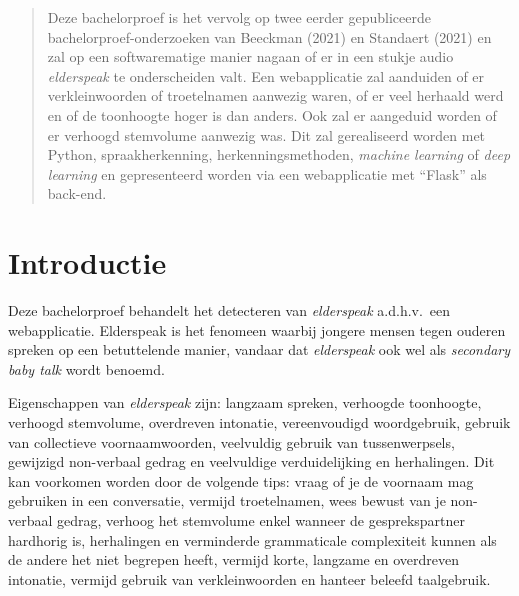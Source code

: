 \documentclass[a0,portrait]{a0poster}
\begin{document}
\begin{multicols}{2} %


\color{HoGentAccent1} %

\begin{abstract}
Deze bachelorproef is het vervolg op twee eerder gepubliceerde bachelorproef-onderzoeken van Beeckman (2021) en Standaert (2021) en zal op een softwarematige manier nagaan of er in een stukje audio \textit{elderspeak} te onderscheiden valt. Een webapplicatie zal aanduiden of er verkleinwoorden of troetelnamen aanwezig waren, of er veel herhaald werd en of de toonhoogte hoger is dan anders. Ook zal er aangeduid worden of er verhoogd stemvolume aanwezig was. Dit zal gerealiseerd worden met Python, spraakherkenning, herkenningsmethoden, \textit{machine learning} of \textit{deep learning} en gepresenteerd worden via een webapplicatie met ``Flask'' als back-end.
\end{abstract}
\vspace{1cm}

\color{HoGentAccent1}
\section*{Introductie}
\color{black}
\color{black}
Deze bachelorproef behandelt het detecteren van \textit{elderspeak} a.d.h.v.\ een webapplicatie. Elderspeak is het fenomeen waarbij jongere mensen tegen ouderen spreken op een betuttelende manier, vandaar dat \textit{elderspeak} ook wel als \textit{secondary baby talk} wordt benoemd.

\newline
Eigenschappen van \textit{elderspeak} zijn: langzaam spreken, verhoogde toonhoogte, verhoogd stemvolume, overdreven intonatie, vereenvoudigd woordgebruik, gebruik van collectieve voornaamwoorden, veelvuldig gebruik van tussenwerpsels, gewijzigd non-verbaal gedrag en veelvuldige verduidelijking en herhalingen. Dit kan voorkomen worden door de volgende tips: vraag of je de voornaam mag gebruiken in een conversatie, vermijd troetelnamen, wees bewust van je non-verbaal gedrag, verhoog het stemvolume enkel wanneer de gesprekspartner hardhorig is, herhalingen en verminderde grammaticale complexiteit kunnen als de andere het niet begrepen heeft, vermijd korte, langzame en overdreven intonatie, vermijd gebruik van verkleinwoorden en hanteer beleefd taalgebruik.



\end{multicols}
\end{document}
